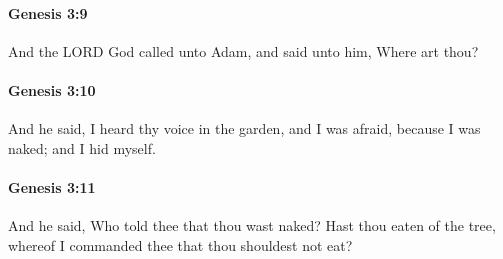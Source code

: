 		\paragraph{Genesis 3:9} %
			\label{GENESIS-3-9}

			And the LORD God called unto Adam, and said unto him, Where art thou?


		\paragraph{Genesis 3:10} %
			\label{GENESIS-3-10}

			And he said, I heard thy voice in the garden, and I was afraid, because I was naked; and I hid myself.


		\paragraph{Genesis 3:11} %
			\label{GENESIS-3-11}

			And he said, Who told thee that thou wast naked?  Hast thou eaten of the tree, whereof I commanded thee that thou shouldest not eat?


